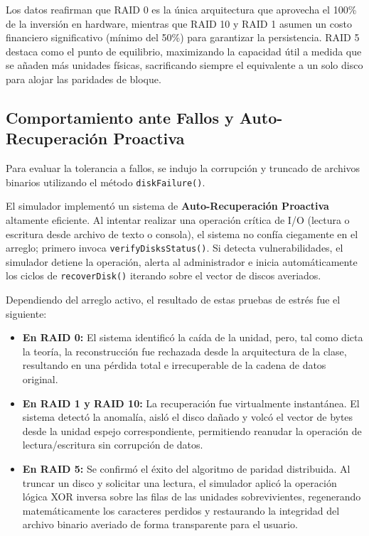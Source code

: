 \documentclass[12pt, a4paper]{article}
\begin{document}
Los datos reafirman que RAID 0 es la única arquitectura que aprovecha el 100\% de la inversión en hardware, mientras que RAID 10 y RAID 1 asumen un costo financiero significativo (mínimo del 50\%) para garantizar la persistencia. RAID 5 destaca como el punto de equilibrio, maximizando la capacidad útil a medida que se añaden más unidades físicas, sacrificando siempre el equivalente a un solo disco para alojar las paridades de bloque.

\subsection{Comportamiento ante Fallos y Auto-Recuperación Proactiva}
Para evaluar la tolerancia a fallos, se indujo la corrupción y truncado de archivos binarios utilizando el método \texttt{diskFailure()}. 

El simulador implementó un sistema de \textbf{Auto-Recuperación Proactiva} altamente eficiente. Al intentar realizar una operación crítica de I/O (lectura o escritura desde archivo de texto o consola), el sistema no confía ciegamente en el arreglo; primero invoca \texttt{verifyDisksStatus()}. Si detecta vulnerabilidades, el simulador detiene la operación, alerta al administrador e inicia automáticamente los ciclos de \texttt{recoverDisk()} iterando sobre el vector de discos averiados. 

Dependiendo del arreglo activo, el resultado de estas pruebas de estrés fue el siguiente:
\begin{itemize}
    \item \textbf{En RAID 0:} El sistema identificó la caída de la unidad, pero, tal como dicta la teoría, la reconstrucción fue rechazada desde la arquitectura de la clase, resultando en una pérdida total e irrecuperable de la cadena de datos original.
    \item \textbf{En RAID 1 y RAID 10:} La recuperación fue virtualmente instantánea. El sistema detectó la anomalía, aisló el disco dañado y volcó el vector de bytes desde la unidad espejo correspondiente, permitiendo reanudar la operación de lectura/escritura sin corrupción de datos.
    \item \textbf{En RAID 5:} Se confirmó el éxito del algoritmo de paridad distribuida. Al truncar un disco y solicitar una lectura, el simulador aplicó la operación lógica XOR inversa sobre las filas de las unidades sobrevivientes, regenerando matemáticamente los caracteres perdidos y restaurando la integridad del archivo binario averiado de forma transparente para el usuario.
\end{itemize}
\end{document}
